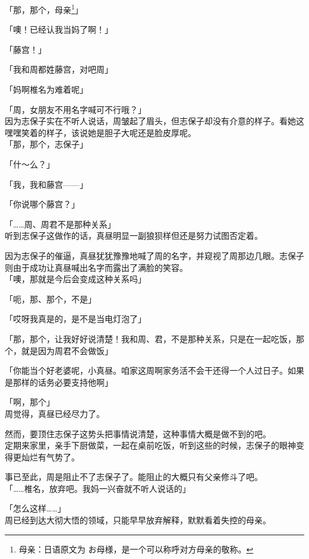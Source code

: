 「那，那个，母亲\footnote{母亲：日语原文为 {\jpfont お母様}，是一个可以称呼对方母亲的敬称。}」

「噢！已经认我当妈了啊！」

「藤宫！」

「我和周都姓藤宫，对吧周」

「妈啊椎名为难着呢」

「周，女朋友不用名字喊可不行哦？」\\

因为志保子实在不听人说话，周皱起了眉头，但志保子却没有介意的样子。看她这嘿嘿笑着的样子，该说她是胆子大呢还是脸皮厚呢。\\

「那，那个，志保子」

「什～么？」

「我，我和藤宫——」

「你说哪个藤宫？」

「……周、周君不是那种关系」\\

听到志保子这做作的话，真昼明显一副狼狈样但还是努力试图否定着。

因为志保子的催逼，真昼犹犹豫豫地喊了周的名字，并窥视了周那边几眼。志保子则由于成功让真昼喊出名字而露出了满脸的笑容。\\

「噢，那就是今后会变成这种关系吗」

「呃，那、那个，不是」

「哎呀我真是的，是不是当电灯泡了」

「那，那个，让我好好说清楚！我和周、君，不是那种关系，只是在一起吃饭，那个，就是因为周君不会做饭」

「你能当个好老婆呢，小真昼。咱家这周啊家务活不会干还得一个人过日子。如果是那样的话务必要支持他啊」

「啊，那个」\\

周觉得，真昼已经尽力了。

然而，要顶住志保子这势头把事情说清楚，这种事情大概是做不到的吧。\\

定期来家里，亲手下厨做菜，一起在桌前吃饭，听到这些的时候，志保子的眼神变得更灿烂有气势了。

事已至此，周是阻止不了志保子了。能阻止的大概只有父亲修斗了吧。\\

「……椎名，放弃吧。我妈一兴奋就不听人说话的」

「怎么这样……」\\

周已经到达大彻大悟的领域，只能早早放弃解释，默默看着失控的母亲。
